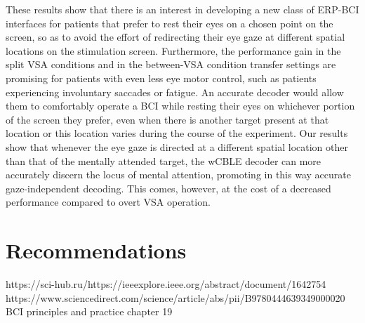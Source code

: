 These results show that there is an interest in developing a new class of ERP-BCI
interfaces for patients that prefer to rest their eyes on a chosen point on the
screen, so as to avoid the effort of redirecting their eye gaze at different spatial locations on
the stimulation screen. Furthermore, the performance gain in the split VSA conditions
and in the between-VSA condition transfer settings are promising for patients with even
less eye motor control, such as patients experiencing involuntary saccades or
fatigue. An accurate decoder would allow them to comfortably operate a BCI while
resting their eyes on whichever portion of the screen they prefer, even when there is
another target present at that location or this location varies during the course of the
experiment. Our results show that whenever the eye gaze is directed at a different
spatial location other than that of the mentally attended target, the wCBLE decoder can
more accurately discern the locus of mental attention, promoting in this way accurate
gaze-independent decoding. This comes, however, at the cost of a decreased performance
compared to overt VSA operation.

\section{Recommendations}
https://sci-hub.ru/https://ieeexplore.ieee.org/abstract/document/1642754
https://www.sciencedirect.com/science/article/abs/pii/B9780444639349000020
BCI principles and practice chapter 19
